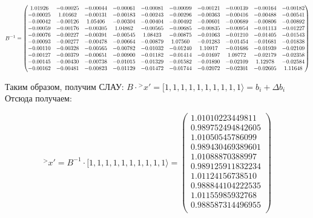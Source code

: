 \documentclass[a4paper, 12pt]{extarticle}
\begin{document}
\begin{equation}
    \scalemath{0.8}{
        B^{-1} = \begin{pmatrix}
            1.01926 & -0.00025 & -0.00044 & -0.00061 & -0.00081 & -0.00099 & -0.00121 & -0.00139 & -0.00164 & -0.00182 \\ 
            -0.00025 & 1.01662 & -0.00131 & -0.00183 & -0.00243 & -0.00296 & -0.00363 & -0.00416 & -0.00488 & -0.00541 \\ 
            -0.00042 & -0.00126 & 1.05406 & -0.00304 & -0.00404 & -0.00492 & -0.00601 & -0.00689 & -0.00806 & -0.00892 \\ 
            -0.00059 & -0.00176 & -0.00305 & 1.04862 & -0.00565 & -0.00685 & -0.00835 & -0.00954 & -0.01113 & -0.01227 \\ 
            -0.00076 & -0.00227 & -0.00391 & -0.00545 & 1.08423 & -0.00875 & -0.01063 & -0.01210 & -0.01405 & -0.01543 \\ 
            -0.00093 & -0.00277 & -0.00478 & -0.00664 & -0.00879 & 1.07560 & -0.01283 & -0.01454 & -0.01681 & -0.01838 \\ 
            -0.00110 & -0.00328 & -0.00565 & -0.00782 & -0.01032 & -0.01240 & 1.10917 & -0.01686 & -0.01939 & -0.02109 \\ 
            -0.00127 & -0.00379 & -0.00651 & -0.00900 & -0.01182 & -0.01414 & -0.01697 & 1.09772 & -0.02179 & -0.02358 \\ 
            -0.00145 & -0.00430 & -0.00738 & -0.01015 & -0.01329 & -0.01582 & -0.01890 & -0.02109 & 1.12978 & -0.02584 \\ 
            -0.00162 & -0.00481 & -0.00823 & -0.01129 & -0.01472 & -0.01744 & -0.02072 & -0.02301 & -0.02605 & 1.11648
    \end{pmatrix}
    }
\end{equation}

Таким образом, получим СЛАУ: $B \cdot {^> x'} = [ 1,1,1,1,1,1,1,1,1,1 \rangle = b_i + \Delta b_i$ \\
Отсюда получаем:

\begin{equation}
    {^> x'} = B^{-1} \cdot [ 1,1,1,1,1,1,1,1,1,1 \rangle = \begin{pmatrix}
        1.01010223449811 \\ 
        0.989752494842605 \\ 
        1.01050545786099 \\ 
        0.989430469389601 \\ 
        1.01088870388997 \\ 
        0.989125911832234 \\ 
        1.01124156738510 \\ 
        0.988844104222535 \\ 
        1.01155985932768 \\ 
        0.988587314496955 \\
   \end{pmatrix}
\end{equation}
\end{document}
